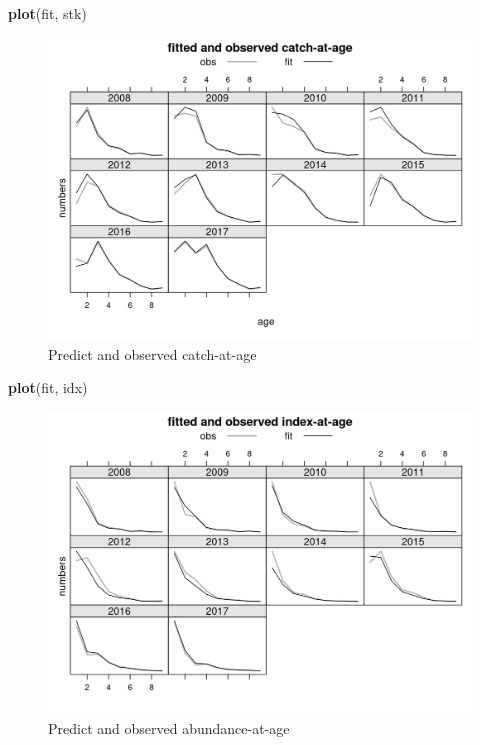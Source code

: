 \documentclass[
]{book}
\newenvironment{Shaded}{\begin{snugshade}}{\end{snugshade}}
\newcommand{\FunctionTok}[1]{\textcolor[rgb]{0.13,0.29,0.53}{\textbf{#1}}}
\newcommand{\NormalTok}[1]{#1}
\begin{document}
\begin{Shaded}
\begin{Highlighting}[]
\FunctionTok{plot}\NormalTok{(fit, stk)}
\end{Highlighting}
\end{Shaded}

\begin{figure}
\centering
\includegraphics{_bookdown_files/_main_files/figure-html/selplt-1.png}
\caption{\label{fig:selplt}Predict and observed catch-at-age}
\end{figure}

\begin{Shaded}
\begin{Highlighting}[]
\FunctionTok{plot}\NormalTok{(fit, idx)}
\end{Highlighting}
\end{Shaded}

\begin{figure}
\centering
\includegraphics{_bookdown_files/_main_files/figure-html/idxplt-1.png}
\caption{\label{fig:idxplt}Predict and observed abundance-at-age}
\end{figure}
\end{document}
